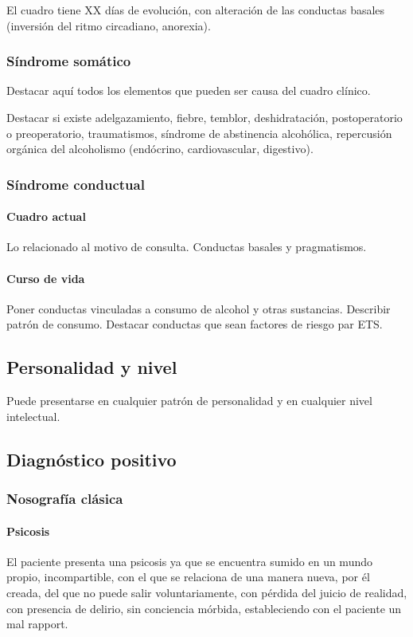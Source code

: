 El cuadro tiene XX días de evolución, con alteración de las conductas basales (inversión del ritmo circadiano, anorexia).

\subsubsection*{Síndrome somático}

Destacar aquí todos los elementos que pueden ser causa del cuadro clínico.

Destacar si existe adelgazamiento, fiebre, temblor, deshidratación, postoperatorio o preoperatorio, traumatismos, síndrome de abstinencia alcohólica, repercusión orgánica del alcoholismo (endócrino, cardiovascular, digestivo).
\subsubsection*{Síndrome conductual}
\paragraph{Cuadro actual}
Lo relacionado al motivo de consulta. Conductas basales y pragmatismos.
\paragraph{Curso de vida}
Poner conductas vinculadas a consumo de alcohol y otras sustancias. Describir patrón de consumo. Destacar conductas que sean factores de riesgo par ETS.
\subsection*{Personalidad y nivel}
Puede presentarse en cualquier patrón de personalidad y en cualquier nivel intelectual.
\subsection*{Diagnóstico positivo}
\subsubsection*{Nosografía clásica}
\paragraph{Psicosis}
El paciente presenta una psicosis ya que se encuentra sumido en un mundo propio, incompartible, con el que se relaciona de una manera nueva, por él creada, del que no puede salir voluntariamente, con pérdida del juicio de realidad, con presencia de delirio, sin conciencia mórbida, estableciendo con el paciente un mal rapport.
